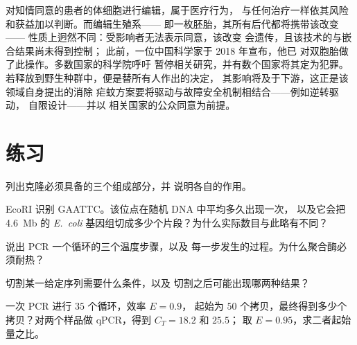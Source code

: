 \begin{remark}[可以编辑什么]\label{rem:b3:genetic-engineering:ethics}
对知情同意的患者的体细胞进行编辑，属于医疗行为，
与任何治疗一样依其风险和获益加以判断。而编辑生殖系——
即一枚胚胎，其所有后代都将携带该改变——
性质上迥然不同：受影响者无法表示同意，该改变
会遗传，且该技术的与嵌合结果尚未得到控制；
此前，一位中国科学家于 2018 年宣布，他已
对双胞胎做了此操作。多数国家的科学院呼吁
暂停相关研究，并有数个国家将其定为犯罪。
若释放到野生种群中，便是替所有人作出的决定，
其影响将及于下游，这正是该领域自身提出的消除
疟蚊方案要将驱动与故障安全机制相结合——例如逆转驱动，
自限设计——并以
相关国家的公众同意为前提。
\end{remark}

\section{练习}

\begin{exercise}[$\star$]\label{exo:b3:genetic-engineering:1}
列出克隆必须具备的三个组成部分，并
说明各自的作用。
\end{exercise}

\begin{exercise}[$\star$]\label{exo:b3:genetic-engineering:2}
EcoRI 识别 GAATTC。该位点在随机 DNA 中平均多久出现一次，
以及它会把 \qty{4.6}{Mb} 的
\emph{E.~coli} 基因组切成多少个片段？为什么实际数目与此略有不同？
\end{exercise}

\begin{exercise}[$\star$]\label{exo:b3:genetic-engineering:3}
说出 PCR 一个循环的三个温度步骤，以及
每一步发生的过程。为什么聚合酶必须耐热？
\end{exercise}

\begin{exercise}[$\star$]\label{exo:b3:genetic-engineering:4}
 切割某一给定序列需要什么条件，以及
切割之后可能出现哪两种结果？
\end{exercise}

\begin{exercise}[$\star\star$]\label{exo:b3:genetic-engineering:5}
一次 PCR 进行 $35$ 个循环，效率 $E = 0.9$，
起始为 $50$ 个拷贝，最终得到多少个拷贝？对两个样品做 qPCR，得到 $C_{T} = 18.2$ 和 $25.5$；
取 $E = 0.95$，求二者起始量之比。
\end{exercise}

